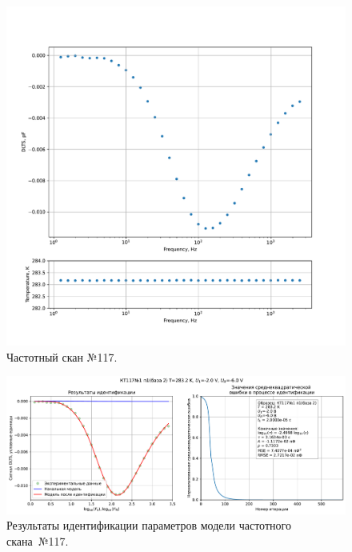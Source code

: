 \begin{figure}[!ht]
    \centering
    \includegraphics[width=1\textwidth]{../plots/КТ117№1_п1(база 2)_2500Гц-1Гц_1пФ_+10С_-2В-6В_200мВ_20мкс_шаг_0,1.pdf}
    \caption{Частотный скан №117.}
    \label{pic:frequency_scan_117}
\end{figure}

\begin{figure}[!ht]
    \centering
    \includegraphics[width=1\textwidth]{../plots/КТ117№1_п1(база 2)_2500Гц-1Гц_1пФ_+10С_-2В-6В_200мВ_20мкс_шаг_0,1_model.pdf}
    \caption{Результаты идентификации параметров модели частотного скана~№117.}
    \label{pic:frequency_scan_model117}
\end{figure}

\pagebreak


